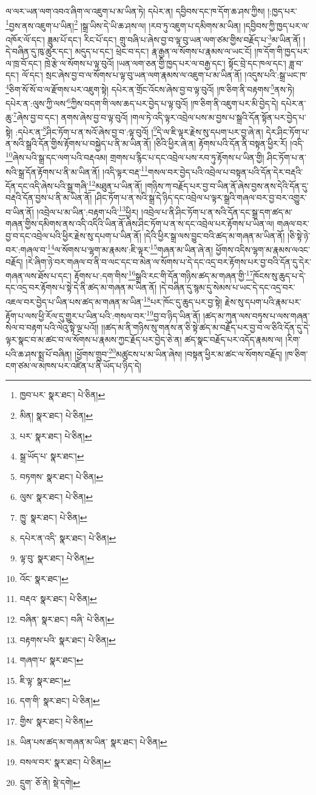 ལ་ལར་ཡན་ལག་འབའ་ཞིག་ལ་འཇུག་པ་མ་ཡིན་ཏེ། དཔེར་ན། དབྱིབས་དང་ཁ་དོག་ཆ་ཤས་ཀྱིས། །:ཁྱད་པར་\footnote{ཁྱབ་པར་  སྣར་ཐང་།  པེ་ཅིན། }བྱས་ནས་འཇུག་པ་ཡིན།\footnote{མིན།  སྣར་ཐང་།  པེ་ཅིན། } །སྒྲ་ཡིས་དེ་ཡི་ཆ་ཤས་ལ། །རབ་ཏུ་འཇུག་པ་དམིགས་མ་ཡིན། །དབྱིབས་ཀྱི་ཁྱད་པར་ལ་འཁོར་ལོ་དང་། ཟླུམ་པོ་དང་། རིང་པོ་དང་། གྲུ་བཞི་པ་ཞེས་བྱ་བ་ལྟ་བུ་ཡན་ལག་ཙམ་གྱིས་བརྗོད་པ་\footnote{པར་  སྣར་ཐང་།  པེ་ཅིན། }མ་ཡིན་ནོ། །དེ་བཞིན་དུ་ཁུ་ཚུར་དང་། མདུད་པ་དང་། ཕྲེང་བ་དང་། རྣ་རྒྱན་ལ་སོགས་པ་རྣམས་ལ་ཡང་ངོ། །ཁ་དོག་གི་ཁྱད་པར་ལ་ཁྲ་བོ་དང་། ཁྲེ་རྩེ་ལ་སོགས་པ་ལྟ་བུའོ། །ཡན་ལག་ཅན་གྱི་ཁྱད་པར་ལ་བརྒྱ་དང་། སྟོང་བྲེ་དང་ཁལ་དང་། ཟླ་བ་དང་། ལོ་དང་། སྲང་ཞེས་བྱ་བ་ལ་སོགས་པ་ལྟ་བུ་ཡན་ལག་རྣམས་ལ་འཇུག་པ་མ་ཡིན་ནོ། །འདུས་པའི་:སྒྲ་ཡང་ཁ་\footnote{སྒྲ་ཡོད་པ་  སྣར་ཐང་། }ཅིག་སོ་སོ་བ་ལ་རྫོགས་པར་འཇུག་སྟེ། དཔེར་ན་གྲོང་འོངས་ཞེས་བྱ་བ་ལྟ་བུའོ། །ཁ་ཅིག་ནི་བརྟགས་\footnote{བཏགས་  སྣར་ཐང་།  པེ་ཅིན། }ནས་ཏེ། དཔེར་ན་:ལུས་ཀྱི་ལས་\footnote{ལུས་  སྣར་ཐང་།  པེ་ཅིན། }ཀྱིས་བདག་གི་ལས་ཆད་པར་བྱེད་པ་ལྟ་བུའོ། །ཁ་ཅིག་ནི་འཇུག་པར་མི་བྱེད་དེ། དཔེར་ན་ཆུ་\footnote{ཁྱུ་  སྣར་ཐང་།  པེ་ཅིན། }ཞེས་བྱ་བ་དང་། ནགས་ཞེས་བྱ་བ་ལྟ་བུའོ། །གལ་ཏེ་འདི་ལྟར་འབྲེལ་པས་མ་བྱས་པ་སྒྲའི་དོན་སྟོན་པར་བྱེད་པ་སྟེ། :དཔེར་ན་\footnote{དཔེར་ན་འདི་  སྣར་ཐང་།  པེ་ཅིན། }ཤིང་ཏོག་པ་ན་སའོ་ཞེས་བྱ་བ་:ལྟ་བུའོ། །\footnote{ལྟ་བུ་  སྣར་ཐང་།  པེ་ཅིན། }དེ་ལ་ཇི་ལྟར་རྗེས་སུ་དཔག་པར་བྱ་ཞེ་ན། དེར་ཤིང་ཏོག་པ་ན་སའི་སྒྲའི་དོན་གྱིས་རྟོགས་པ་བསྐྱེད་པ་ནི་མ་ཡིན་ནོ། །ཅིའི་ཕྱིར་ཞེ་ན། རྟོགས་པའི་དོན་ནི་བསྟན་ཕྱིར་རོ། །འདི་\footnote{འོང་  སྣར་ཐང་། }ཞེས་པའི་སྒྲ་དང་ལག་པའི་བརྡའམ། གྲགས་པ་རྙིང་པ་དང་འབྲེལ་པས་རབ་ཏུ་རྟོགས་པ་ཡིན་གྱི། ཤིང་ཏོག་པ་ན་སའི་སྒྲ་དོན་རྟོགས་པ་ནི་མ་ཡིན་ནོ། །འདི་ལྟར་བརྡ་\footnote{བརྡའ་  སྣར་ཐང་།  པེ་ཅིན། }གསལ་བར་བྱེད་པའི་འབྲེལ་པ་བསྟན་པའི་དོན་དེར་བརྡའི་དོན་དང་འདི་ཞེས་པའི་སྒྲ་གཞི་\footnote{བཞིན་  སྣར་ཐང་། བཞི་  པེ་ཅིན། }མཐུན་པ་ཡིན་ནོ། །གཉིས་ཀ་བརྗོད་པར་བྱ་བ་ཡིན་ནོ་ཞེས་བྱས་ནས་དེའི་དོན་དུ་བརྡའི་དོན་བྱས་པ་ནི་མ་ཡིན་ནོ། །ཤིང་ཏོག་པ་ན་སའི་སྒྲ་དེ་ཉིད་དང་འབྲེལ་པ་ལྟར་སྒྲའི་གཞལ་བར་བྱ་བར་འགྱུར་བ་ཡིན་ནོ། །འབྲེལ་པ་མ་ཡིན་:བརྟག་པའི་\footnote{བརྟགས་པའི་  སྣར་ཐང་།  པེ་ཅིན། }ཕྱིར། །འབྲེལ་པ་ནི་ཤིང་ཏོག་པ་ན་སའི་དོན་དང་སྒྲ་དག་ཚད་མ་གཞན་གྱིས་དམིགས་ནས་འདི་འདིའི་ཡིན་ནོ་ཞེས་ཤིང་ཏོག་པ་ན་ས་དང་འབྲེལ་པར་རྟོགས་པ་ཡིན་ལ། གཞལ་བར་བྱ་བ་དང་འབྲེལ་པའི་ཕྱིར་རྗེས་སུ་དཔག་པ་ཡིན་ནོ། །དེའི་ཕྱིར་སྒྲ་ལས་བྱུང་བའི་ཚད་མ་གཞན་མ་ཡིན་ནོ། །ཅི་སྟེ་ཉེ་བར་:གཞལ་བ་\footnote{གཞག་པ་  སྣར་ཐང་། }ལ་སོགས་པ་ལྷག་མ་རྣམས་:ཇི་ལྟར་\footnote{ཇི་ལྟ་  སྣར་ཐང་། }གཞན་མ་ཡིན་ཞེ་ན། ཕྱོགས་འདིས་ལྷག་མ་རྣམས་ལའང་བརྗོད། །རེ་ཞིག་ཉེ་བར་གཞལ་བ་ནི་བ་ལང་དང་བ་མེན་ལ་སོགས་པ་དེ་དང་འདྲ་བར་རྟོགས་པར་བྱ་བའི་དོན་དུ་དེར་གཞན་ལས་ཐོས་པ་དང་། རྟོགས་པ་:དག་གིས་\footnote{དག་གི་  སྣར་ཐང་།  པེ་ཅིན། }སྒྲའི་རང་གི་དོན་གཉིས་ཚད་མ་གཞན་གྱི་\footnote{གྱིས་  སྣར་ཐང་།  པེ་ཅིན། }ཁོངས་སུ་ཆུད་པ་དེ་དང་འདྲ་བར་རྟོགས་པ་སྟེ་དེ་ནི་ཚད་མ་གཞན་མ་ཡིན་ནོ། །དེ་བཞིན་དུ་སྙམ་དུ་སེམས་པ་ཡང་དེ་དང་འདྲ་བར་འཇལ་བར་བྱེད་པ་ཡིན་པས་ཚད་མ་གཞན་མ་ཡིན་\footnote{ཡིན་པས་ཚད་མ་གཞན་མ་ཡིན་  སྣར་ཐང་།  པེ་ཅིན། }པར་ཁོང་དུ་ཆུད་པར་བྱ་སྟེ། རྗེས་སུ་དཔག་པའི་རྣམ་པར་རྟོག་པ་ལས་ཕྱི་རོལ་དུ་གྱུར་པ་ཡིན་པའི་:གསལ་བར་\footnote{བསལ་བར་  སྣར་ཐང་།  པེ་ཅིན། }བྱ་བ་ཉིད་ཡིན་ནོ། །ཚད་མ་ཀུན་ལས་བཏུས་པ་ལས་གཞན་སེལ་བ་བརྟག་པའི་ལེའུ་སྟེ་ལྔ་པའོ།། །།ཚད་མ་ནི་གཉིས་སུ་གནས་ན་ཅི་སྟེ་ཚད་མ་བརྗོད་པར་བྱ་བ་ལ་ཅིའི་དོན་དུ་དེ་ལྟར་སྣང་བ་མ་ཚང་བ་ལ་སོགས་པ་རྣམས་ཀྱང་རྗོད་པར་བྱེད་ཅེ་ན། ཚད་སྣང་བརྗོད་པར་འདོད་རྣམས་ལ། །རིག་པའི་ཆ་ཤས་སྨྲ་པོ་བཞིན། །ཕྱོགས་གྲུབ་\footnote{དྲུག་  ཅོ་ནེ།  སྡེ་དགེ། }མཚུངས་པ་མ་ཡིན་ཞེས། །བསྟན་ཕྱིར་མ་ཚང་ལ་སོགས་བརྗོད། །ཁ་ཅིག་ངག་ཙམ་ལ་མཁས་པར་འཛིན་པ་ནི་ཡོད་པ་ཉིད་དེ། 